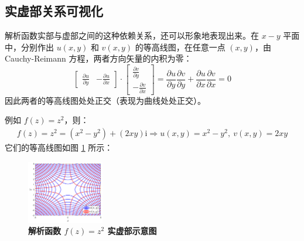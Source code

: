\documentclass[UTF8]{report}
\theoremstyle{MyLineTheoremStyle} %
\theoremstyle{MyBlockTheoremStyle} %
\theoremstyle{MySubsubsectionStyle} %
\begin{document}
\subsection{实虚部关系可视化}
    解析函数实部与虚部之间的这种依赖关系，还可以形象地表现出来。在 $x-y$ 平面中，分别作出 $u(x,y)$ 和 $v(x,y)$ 的等高线图，在任意一点 $(x,y)$，由 Cauchy-Reimann 方程，两者方向矢量的内积为零：
    \begin{equation}
    \begin{bmatrix}
        \frac{\partial u }{\partial y } & - \frac{\partial u }{\partial x }
    \end{bmatrix}
    \cdot 
    \begin{bmatrix}
        \frac{\partial v }{\partial y } \\  -\frac{\partial v }{\partial x }
    \end{bmatrix}
    = \frac{\partial u }{\partial y }\frac{\partial v }{\partial y } + \frac{\partial u }{\partial x } \frac{\partial v }{\partial x } = 0
    \end{equation}
    因此两者的等高线图处处正交（表现为曲线处处正交）。
    
    {\par\color{gray}\small
    例如 $f(z) = z^2$，则：
    \begin{gather*}
        f(z) 
        = z^2
        = (x^2-y^2) + (2xy) \mathrm{i} 
        \Longrightarrow u(x,y) = x^2-y^2 ,\ v(x,y) = 2xy
    \end{gather*}
    它们的等高线图如图 \ref{解析函数 $f(z) = z^2$ 实虚部示意图} 所示：
    \begin{figure}[H]\centering
    \includegraphics[width=0.3\textwidth]{assets/1,2/2024-08-28_10-23-23.png}
    \caption{\textbf{解析函数 $f(z) = z^2$ 实虚部示意图}}\label{解析函数 $f(z) = z^2$ 实虚部示意图}
    \end{figure}
    \par}
    
\end{document}
